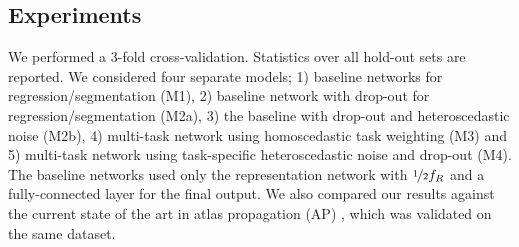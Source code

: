 \subsection{Experiments}
We performed a 3-fold cross-validation. Statistics over all hold-out sets are reported. We considered four separate models; 1) baseline networks for regression/segmentation (M1), 2) baseline network with drop-out for regression/segmentation (M2a), 3) the baseline with drop-out and heteroscedastic noise (M2b), 4) multi-task network using homoscedastic task weighting (M3) \cite{kendall2017multi} and 5) multi-task network using task-specific heteroscedastic noise and drop-out (M4). The baseline networks used only the representation network with $\nicefrac{1}{2}f_{R}$ and a fully-connected layer for the final output. We also compared our results against the current state of the art in atlas propagation (AP) \cite{ninon2017}, which was validated on the same dataset.

